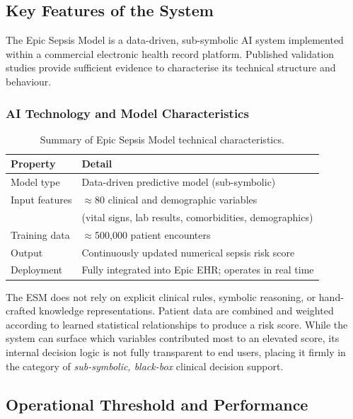 \documentclass[]{UCD_CS_41820_Report}
\begin{document}
\subsection*{Key Features of the System}

The Epic Sepsis Model is a data-driven, sub-symbolic AI system implemented within
a commercial electronic health record platform. Published validation studies provide
sufficient evidence to characterise its technical structure and behaviour.

\subsubsection*{AI Technology and Model Characteristics}

\begin{table}[H]
\centering
\renewcommand{\arraystretch}{1.3}
\begin{tabular}{@{}ll@{}}
\toprule
\textbf{Property} & \textbf{Detail} \\
\midrule
Model type      & Data-driven predictive model (sub-symbolic) \\
Input features  & $\approx$80 clinical and demographic variables \\
                & (vital signs, lab results, comorbidities, demographics) \\
Training data   & $\approx$500{,}000 patient encounters \\
Output          & Continuously updated numerical sepsis risk score \\
Deployment      & Fully integrated into Epic EHR; operates in real time \\
\bottomrule
\end{tabular}
\caption{Summary of Epic Sepsis Model technical characteristics.}
\label{tab:esm_features}
\end{table}

The ESM does not rely on explicit clinical rules, symbolic reasoning, or
hand-crafted knowledge representations. Patient data are combined and weighted
according to learned statistical relationships to produce a risk score. While the
system can surface which variables contributed most to an elevated score, its
internal decision logic is not fully transparent to end users, placing it firmly
in the category of \emph{sub-symbolic, black-box} clinical decision support.
\setlength{\parskip}{0pt}
\subsection*{Operational Threshold and Performance}
\end{document}

